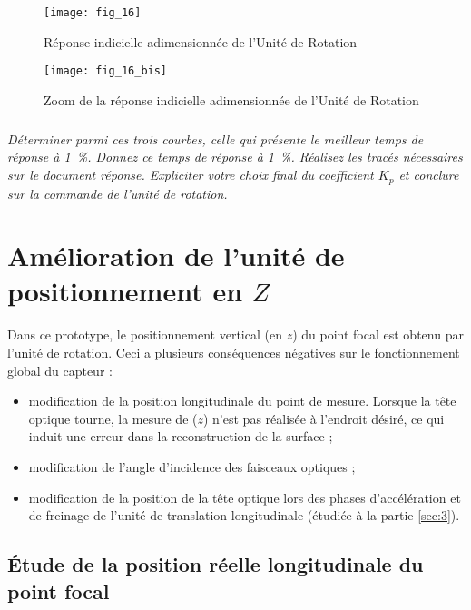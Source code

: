 \begin{minipage}[c]{.47\linewidth}
\begin{figure}[H]
\centering
\texttt{[image: fig\_16]}
\caption{\label{fig_16}Réponse indicielle adimensionnée de l’Unité de Rotation}
\end{figure}
\end{minipage}\hfill
\begin{minipage}[c]{.47\linewidth}
\begin{figure}[H]
\centering
\texttt{[image: fig\_16\_bis]}
\caption{\label{fig_16b} Zoom de la réponse indicielle adimensionnée de l’Unité de Rotation}
\end{figure}
\end{minipage}

\subparagraph{\label{q_14}}\textit{Déterminer parmi ces trois courbes, celle qui présente le meilleur temps de réponse à \SI{1}{\%}. Donnez ce temps de réponse à \SI{1}{\%}. Réalisez les tracés nécessaires sur le document réponse.
Expliciter votre choix final du coefficient $K_p$ et conclure sur la commande de l’unité de rotation.}
\ifprof
\begin{corrige}
\end{corrige}
\else
\fi


\section{Amélioration de l’unité de positionnement en $Z$}

Dans ce prototype, le positionnement vertical (en $z$) du point focal est obtenu par l’unité de rotation. Ceci a
plusieurs conséquences négatives sur le fonctionnement global du capteur :
\begin{itemize}
\item modification de la position longitudinale du point de mesure. Lorsque la tête optique tourne, la
mesure de ($z$) n’est pas réalisée à l’endroit désiré, ce qui induit une erreur dans la reconstruction de
la surface ;
\item modification de l’angle d’incidence des faisceaux optiques ;
\item modification de la position de la tête optique lors des phases d’accélération et de freinage de l’unité
de translation longitudinale (étudiée à la partie \ref{sec:3}).
\end{itemize}


\subsection{Étude de la position réelle longitudinale du point focal}

